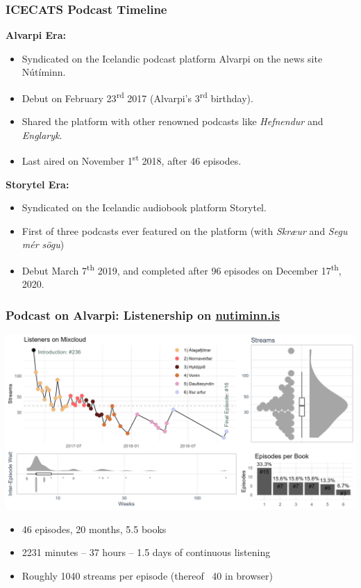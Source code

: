 \begin{frame}
    \frametitle{ICECATS Podcast Timeline}

    \textbf{Alvarpi\dh{} Era:}
    \begin{itemize}
        \item Syndicated on the Icelandic podcast platform Alvarpi\dh{} on the news site N\'{u}t\'{i}minn.
        \item Debut on February 23\textsuperscript{rd} 2017 (Alvarpi\dh's 3\textsuperscript{rd} birthday).
        \item Shared the platform with other renowned podcasts like \emph{Hefnendur} and \emph{Englaryk}.
        \item Last aired on November 1\textsuperscript{st} 2018, after 46 episodes.
    \end{itemize}

    \textbf{Storytel Era:}
    \begin{itemize}
        \item Syndicated on the Icelandic audiobook platform Storytel.
        \item First of three podcasts ever featured on the platform
        (with \emph{Skr\ae{}\dh{}ur} and \emph{Seg\dh{}u m\'{e}r s\"{o}gu})
        \item Debut March 7\textsuperscript{th} 2019, and completed after
        96 episodes on December 17\textsuperscript{th}, 2020.
    \end{itemize}

\end{frame}


\begin{frame}
    \frametitle{Podcast on Alvarpi\dh{}: Listenership on \url{nutiminn.is}}
    \includegraphics[width=\textwidth]{../R/figures/alvarpid_listeners.png}

    \begin{itemize}
        \item 46 episodes, 20 months, 5.5 books
        \item 2231 minutes -- 37 hours -- 1.5 days of continuous listening
        \item Roughly 1040 streams per episode (thereof ~40 in browser)
    \end{itemize}

\end{frame}


